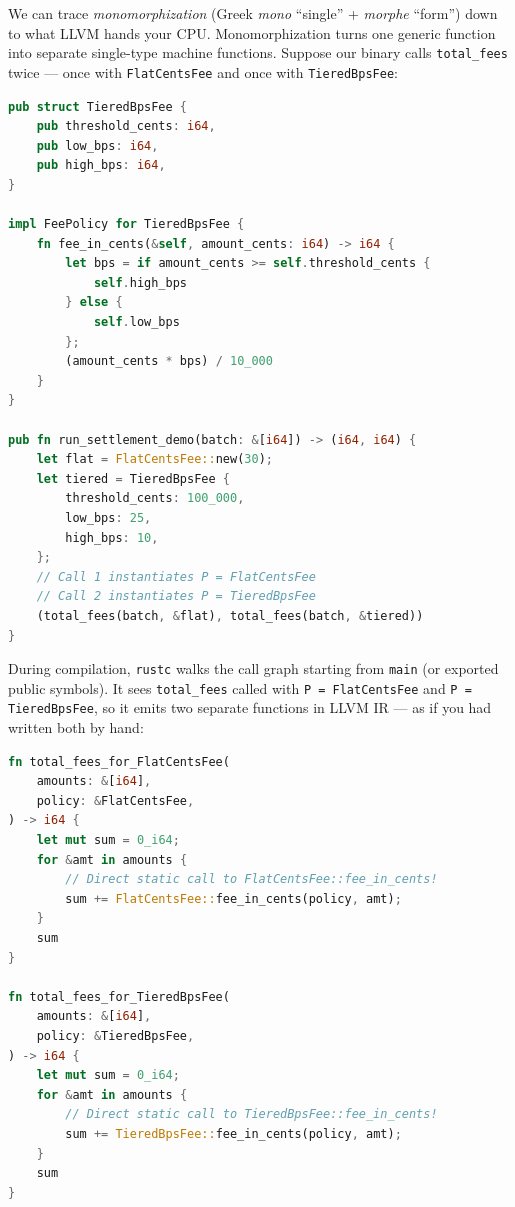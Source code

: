 We can trace \emph{monomorphization} (Greek \emph{mono} ``single'' + \emph{morphe} ``form'') down to what LLVM hands your CPU. Monomorphization turns one generic function into separate single-type machine functions. Suppose our binary calls \texttt{total\_fees} twice --- once with \texttt{FlatCentsFee} and once with \texttt{TieredBpsFee}:

\begin{lstlisting}[language=Rust, caption={Two calls to a generic function and the two specialized functions rustc stamps out before LLVM optimization.}]
pub struct TieredBpsFee {
    pub threshold_cents: i64,
    pub low_bps: i64,
    pub high_bps: i64,
}

impl FeePolicy for TieredBpsFee {
    fn fee_in_cents(&self, amount_cents: i64) -> i64 {
        let bps = if amount_cents >= self.threshold_cents {
            self.high_bps
        } else {
            self.low_bps
        };
        (amount_cents * bps) / 10_000
    }
}

pub fn run_settlement_demo(batch: &[i64]) -> (i64, i64) {
    let flat = FlatCentsFee::new(30);
    let tiered = TieredBpsFee {
        threshold_cents: 100_000,
        low_bps: 25,
        high_bps: 10,
    };
    // Call 1 instantiates P = FlatCentsFee
    // Call 2 instantiates P = TieredBpsFee
    (total_fees(batch, &flat), total_fees(batch, &tiered))
}
\end{lstlisting}

During compilation, \texttt{rustc} walks the call graph starting from \texttt{main} (or exported public symbols). It sees \texttt{total\_fees} called with \texttt{P = FlatCentsFee} and \texttt{P = TieredBpsFee}, so it emits two separate functions in LLVM IR --- as if you had written both by hand:

\begin{lstlisting}[language=Rust, caption={Conceptual monomorphized output generated by rustc prior to LLVM inlining.}]
fn total_fees_for_FlatCentsFee(
    amounts: &[i64],
    policy: &FlatCentsFee,
) -> i64 {
    let mut sum = 0_i64;
    for &amt in amounts {
        // Direct static call to FlatCentsFee::fee_in_cents!
        sum += FlatCentsFee::fee_in_cents(policy, amt);
    }
    sum
}

fn total_fees_for_TieredBpsFee(
    amounts: &[i64],
    policy: &TieredBpsFee,
) -> i64 {
    let mut sum = 0_i64;
    for &amt in amounts {
        // Direct static call to TieredBpsFee::fee_in_cents!
        sum += TieredBpsFee::fee_in_cents(policy, amt);
    }
    sum
}
\end{lstlisting}

